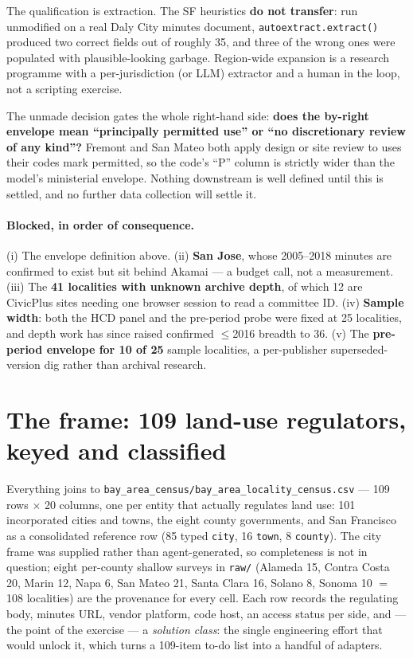 \documentclass[11pt]{article}
\begin{document}
The qualification is extraction. The SF heuristics \textbf{do not transfer}: run unmodified on a
real Daly City minutes document, \texttt{autoextract.extract()} produced two correct fields out
of roughly 35, and three of the wrong ones were populated with plausible-looking garbage.
Region-wide expansion is a research programme with a per-jurisdiction (or LLM) extractor and a
human in the loop, not a scripting exercise.

The unmade decision gates the whole right-hand side: \textbf{does the by-right envelope mean
``principally permitted use'' or ``no discretionary review of any kind''?} Fremont and San Mateo
both apply design or site review to uses their codes mark permitted, so the code's ``P'' column
is strictly wider than the model's ministerial envelope. Nothing downstream is well defined until
this is settled, and no further data collection will settle it.

\paragraph{Blocked, in order of consequence.} (i) The envelope definition above. (ii)
\textbf{San Jose}, whose 2005--2018 minutes are confirmed to exist but sit behind Akamai --- a
budget call, not a measurement. (iii) The \textbf{41 localities with unknown archive depth}, of
which 12 are CivicPlus sites needing one browser session to read a committee ID. (iv)
\textbf{Sample width}: both the HCD panel and the pre-period probe were fixed at 25 localities,
and depth work has since raised confirmed $\leq$2016 breadth to 36. (v) The \textbf{pre-period
envelope for 10 of 25} sample localities, a per-publisher superseded-version dig rather than
archival research.

\section{The frame: 109 land-use regulators, keyed and classified}

Everything joins to \texttt{bay\_area\_census/bay\_area\_locality\_census.csv} --- 109 rows
$\times$ 20 columns, one per entity that actually regulates land use: 101 incorporated cities and
towns, the eight county governments, and San Francisco as a consolidated reference row (85 typed
\texttt{city}, 16 \texttt{town}, 8 \texttt{county}). The city frame was supplied rather than
agent-generated, so completeness is not in question; eight per-county shallow surveys in
\texttt{raw/} (Alameda 15, Contra Costa 20, Marin 12, Napa 6, San Mateo 21, Santa Clara 16,
Solano 8, Sonoma 10 $=$ 108 localities) are the provenance for every cell. Each row records the
regulating body, minutes URL, vendor platform, code host, an access status per side, and --- the
point of the exercise --- a \emph{solution class}: the single engineering effort that would
unlock it, which turns a 109-item to-do list into a handful of adapters.
\end{document}
